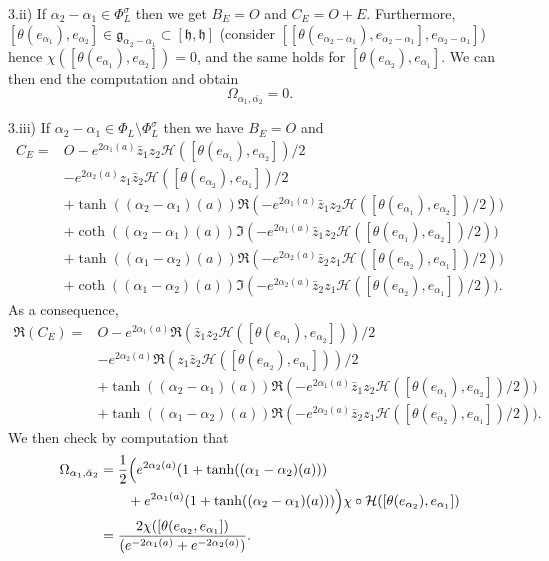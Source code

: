 \documentclass{amsart}
\theoremstyle{definition}
\begin{document}
3.ii) 
If $\alpha_2-\alpha_1 \in \Phi_L^{\sigma}$ then we get $B_E=O$ and $C_E=O+E$.
Furthermore, $[\theta(e_{\alpha_1}),e_{\alpha_2}]\in 
\mathfrak{g}_{\alpha_2-\alpha_1}\subset [\mathfrak{h},\mathfrak{h}]$ 
(consider $[[\theta(e_{\alpha_2-\alpha_1}),e_{\alpha_2-\alpha_1}],e_{\alpha_2-\alpha_1}]$)
hence $\chi([\theta(e_{\alpha_1}),e_{\alpha_2}])=0$, and the same holds for 
$[\theta(e_{\alpha_2}),e_{\alpha_1}]$. 
We can then end the computation and obtain  
\[
\Omega_{\alpha_1,\bar{\alpha_2}}=0.
\]

3.iii) %
If $\alpha_2-\alpha_1 \in \Phi_L\setminus \Phi_L^{\sigma}$ then 
we have $B_E=O$ and 
\begin{align*}
C_E  = & O -e^{2\alpha_1(a)}\bar{z}_1z_2\mathcal{H}([\theta(e_{\alpha_1}),e_{\alpha_2}])/2 \\
& -e^{2\alpha_2(a)}z_1\bar{z}_2\mathcal{H}([\theta(e_{\alpha_2}),e_{\alpha_1}])/2 \\
&  +\tanh((\alpha_2-\alpha_1)(a))\Re(-e^{2\alpha_1(a)}\bar{z}_1z_2\mathcal{H}([\theta(e_{\alpha_1}),e_{\alpha_2}])/2)) \\
&  +\coth((\alpha_2-\alpha_1)(a))\Im(-e^{2\alpha_1(a)}\bar{z}_1z_2\mathcal{H}([\theta(e_{\alpha_1}),e_{\alpha_2}])/2)) \\
&  +\tanh((\alpha_1-\alpha_2)(a))\Re(-e^{2\alpha_2(a)}\bar{z}_2z_1\mathcal{H}([\theta(e_{\alpha_2}),e_{\alpha_1}])/2)) \\
&  +\coth((\alpha_1-\alpha_2)(a))\Im(-e^{2\alpha_2(a)}\bar{z}_2z_1\mathcal{H}([\theta(e_{\alpha_2}),e_{\alpha_1}])/2)). 
\end{align*}
As a consequence, 
\begin{align*}
\Re(C_E) = & O -e^{2\alpha_1(a)}\Re(\bar{z}_1z_2\mathcal{H}([\theta(e_{\alpha_1}),e_{\alpha_2}]))/2 \\
& -e^{2\alpha_2(a)}\Re(z_1\bar{z}_2\mathcal{H}([\theta(e_{\alpha_2}),e_{\alpha_1}]))/2 \\
&  +\tanh((\alpha_2-\alpha_1)(a))\Re(-e^{2\alpha_1(a)}\bar{z}_1z_2\mathcal{H}([\theta(e_{\alpha_1}),e_{\alpha_2}])/2)) \\
&  +\tanh((\alpha_1-\alpha_2)(a))\Re(-e^{2\alpha_2(a)}\bar{z}_2z_1\mathcal{H}([\theta(e_{\alpha_2}),e_{\alpha_1}])/2)). 
\end{align*}
We then check by computation that 
\begin{align*} 
\Omega_{\alpha_1,\bar{\alpha}_2} & = 
\frac{1}{2}\Big{(}
e^{2\alpha_2(a)}(1+\tanh((\alpha_1-\alpha_2)(a))) \\ 
& \qquad 
+e^{2\alpha_1(a)}(1+\tanh((\alpha_2-\alpha_1)(a))) 
\Big{)}
\chi\circ\mathcal{H}([\theta(e_{\alpha_2}),e_{\alpha_1}])  \\
& = \frac{ 2 \chi([\theta(e_{\alpha_2},e_{\alpha_1}])}{(e^{-2\alpha_1(a)}+e^{-2\alpha_2(a)})}.
\end{align*}
\end{document}
